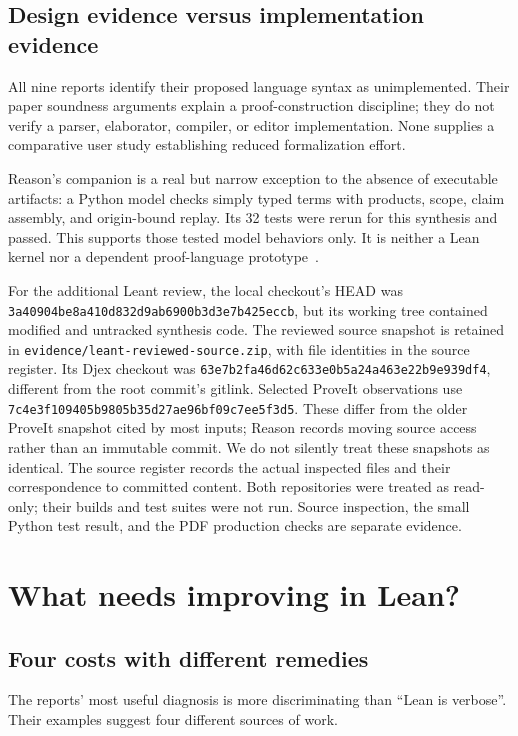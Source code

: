 \documentclass[11pt,letterpaper]{article}
\newcommand{\code}[1]{\nolinkurl{#1}}
\begin{document}
\subsection{Design evidence versus implementation evidence}
All nine reports identify their proposed language syntax as unimplemented. Their
paper soundness arguments explain a proof-construction discipline; they do not
verify a parser, elaborator, compiler, or editor implementation. None supplies a
comparative user study establishing reduced formalization effort.

Reason's companion is a real but narrow exception to the absence of executable
artifacts: a Python model checks simply typed terms with products, scope,
claim assembly, and origin-bound replay. Its 32 tests were rerun for this synthesis
and passed. This supports those tested model behaviors only. It is neither a Lean
kernel nor a dependent proof-language prototype~\cite[\S18]{reason}.

For the additional Leant review, the local checkout's HEAD was
\code{3a40904be8a410d832d9ab6900b3d3e7b425eccb}, but its working tree contained
modified and untracked synthesis code. The reviewed source snapshot is retained
in \code{evidence/leant-reviewed-source.zip}, with file identities in the source
register. Its Djex checkout was \code{63e7b2fa46d62c633e0b5a24a463e22b9e939df4},
different from the root commit's gitlink. Selected ProveIt observations use
\code{7c4e3f109405b9805b35d27ae96bf09c7ee5f3d5}. These differ from the older ProveIt
snapshot cited by most inputs; Reason records moving source access rather than
an immutable commit. We do not silently treat these snapshots as identical.
The source register records the actual inspected files and their correspondence
to committed content. Both repositories were treated as read-only; their builds
and test suites were not run. Source inspection, the small Python test result,
and the PDF production checks are separate evidence.

\section{What needs improving in Lean?}\label{sec:diagnosis}
\subsection{Four costs with different remedies}
The reports' most useful diagnosis is more discriminating than ``Lean is verbose''.
Their examples suggest four different sources of work.
\end{document}
